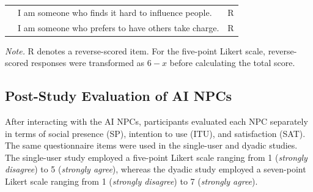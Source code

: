 \documentclass[a4paper,fleqn]{cas-sc}
\begin{document}
\begin{table}[t]
\begin{tabular}{p{}p{}c}
&
I am someone who finds it hard to influence people. &
R \\

&
I am someone who prefers to have others take charge. &
R \\

\bottomrule
\end{tabular}

\vspace{2mm}
\begin{minipage}{0.95\textwidth}
\footnotesize
\textit{Note.} R denotes a reverse-scored item. 
For the five-point Likert scale, reverse-scored responses were transformed as $6-x$ before calculating the total score.
\end{minipage}
\end{table}


\subsection{Post-Study Evaluation of AI NPCs}
\label{app:posttest}

After interacting with the AI NPCs, participants evaluated each NPC separately in terms of social presence (SP), intention to use (ITU), and satisfaction (SAT). 
The same questionnaire items were used in the single-user and dyadic studies. 
The single-user study employed a five-point Likert scale ranging from 1 (\textit{strongly disagree}) to 5 (\textit{strongly agree}), whereas the dyadic study employed a seven-point Likert scale ranging from 1 (\textit{strongly disagree}) to 7 (\textit{strongly agree}).
\end{document}
